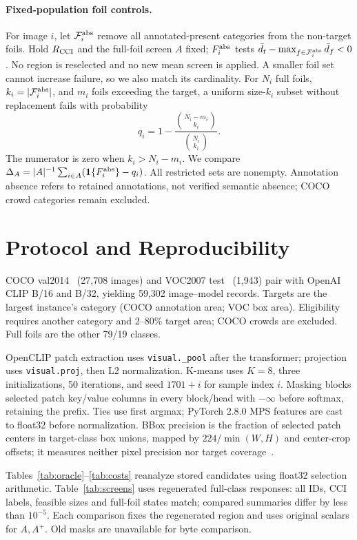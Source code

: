 \documentclass[10pt]{article}
\newcommand{\foils}{\mathcal F}
\begin{document}
\paragraph{Fixed-population foil controls.}
For image $i$, let $\foils_i^{\rm abs}$ remove all annotated-present categories
from the non-target foils. Hold $R_{\rm CCI}$ and the full-foil screen $A$ fixed;
$F_i^{\rm abs}$ tests $\bar d_t-\max_{f\in\foils_i^{\rm abs}}\bar d_f<0$.
No region is reselected and no new mean screen is applied. A smaller foil set
cannot increase failure, so we also match its cardinality. For $N_i$ full
foils, $k_i=|\foils_i^{\rm abs}|$, and $m_i$ foils exceeding the target,
a uniform size-$k_i$ subset without replacement fails with probability
\begin{equation}
q_i=1-\frac{\binom{N_i-m_i}{k_i}}{\binom{N_i}{k_i}}.
\label{eq:matched}
\end{equation}
The numerator is zero when $k_i>N_i-m_i$. We compare
$\Delta_A=|A|^{-1}\sum_{i\in A}(\mathbf1\{F_i^{\rm abs}\}-q_i)$.
All restricted sets are nonempty. Annotation absence refers to retained
annotations, not verified semantic absence; COCO crowd categories remain excluded.

\section{Protocol and Reproducibility}
COCO val2014~\cite{lin2014coco} (27,708 images) and VOC2007
test~\cite{everingham2010voc} (1,943) pair with OpenAI CLIP B/16 and B/32,
yielding 59,302 image--model records. Targets are the largest instance's
category (COCO annotation area; VOC box area). Eligibility requires another
category and 2--80\% target area; COCO crowds are excluded.
Full foils are the other 79/19 classes.

OpenCLIP patch extraction uses \texttt{visual.\_pool} after the
transformer; projection uses \texttt{visual.proj}, then L2 normalization. K-means uses $K=8$, three
initializations, 50 iterations, and seed $1701+i$ for sample index $i$.
Masking blocks selected patch key/value columns in every block/head with
$-\infty$ before softmax, retaining the prefix. Ties use first argmax;
PyTorch 2.8.0 MPS features are cast to float32 before normalization.
BBox precision is the fraction of selected patch centers in target-class box unions,
mapped by $224/\min(W,H)$ and center-crop offsets; it measures neither pixel
precision nor target coverage~\cite{gomez2022metrics}.

Tables~\ref{tab:oracle}--\ref{tab:costs} reanalyze stored candidates using float32
selection arithmetic. Table~\ref{tab:screens} uses regenerated full-class responses:
all IDs, CCI labels, feasible sizes and full-foil states match; compared summaries
differ by less than $10^{-5}$. Each comparison fixes the regenerated region and
uses original scalars for $A,A^+$. Old masks are unavailable for byte comparison.
\end{document}
